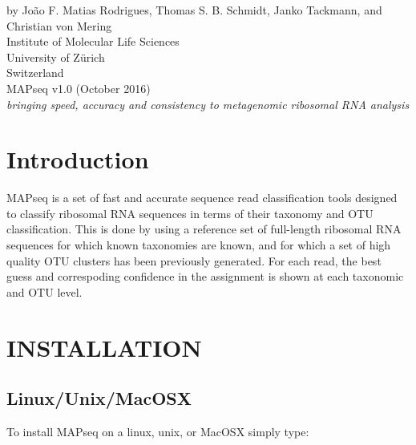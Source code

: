 \documentclass[10pt,a4paper]{article}
\begin{document}
 

\pagestyle{empty} %

{
 \raggedleft %
 \vspace*{\baselineskip} %
 {\Large by Jo\~ao F. Matias Rodrigues, Thomas S. B. Schmidt, Janko Tackmann, and Christian von Mering\\
 Institute of Molecular Life Sciences\\University of Z\"urich\\Switzerland}\\[0.167\textheight] %
 {\Huge MAPseq v1.0 (October 2016)}\\[\baselineskip] %
 {\Large \textit{bringing speed, accuracy and consistency to metagenomic ribosomal RNA analysis}}\par %
}
\vfill %
\vspace*{3\baselineskip} %

\newpage

\tableofcontents
\newpage
{}

\section{Introduction}

MAPseq is a set of fast and accurate sequence read classification tools designed to classify ribosomal
RNA sequences in terms of their taxonomy and OTU classification. This is done by using a
reference set of full-length ribosomal RNA sequences for which known taxonomies are known,
and for which a set of high quality OTU clusters has been previously generated.
For each read, the best guess and correspoding confidence in the assignment is shown at
each taxonomic and OTU level.


\section{INSTALLATION}

\subsection{Linux/Unix/MacOSX}

To install MAPseq on a linux, unix, or MacOSX simply type:
\end{document}
